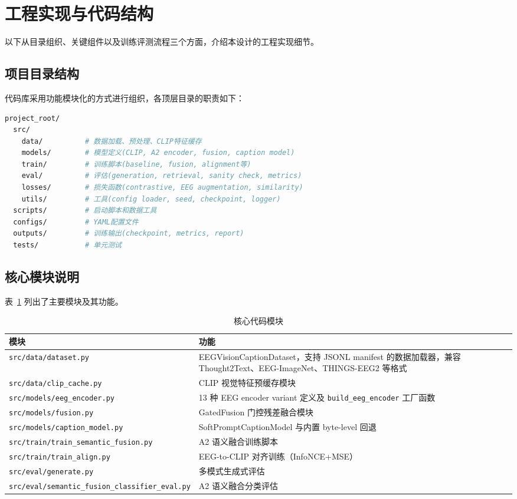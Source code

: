 \section{工程实现与代码结构}

以下从目录组织、关键组件以及训练评测流程三个方面，介绍本设计的工程实现细节。

\subsection{项目目录结构}

代码库采用功能模块化的方式进行组织，各顶层目录的职责如下：

\begin{lstlisting}[language=bash,caption={项目目录结构}]
project_root/
  src/
    data/          # 数据加载、预处理、CLIP特征缓存
    models/        # 模型定义(CLIP, A2 encoder, fusion, caption model)
    train/         # 训练脚本(baseline, fusion, alignment等)
    eval/          # 评估(generation, retrieval, sanity check, metrics)
    losses/        # 损失函数(contrastive, EEG augmentation, similarity)
    utils/         # 工具(config loader, seed, checkpoint, logger)
  scripts/         # 启动脚本和数据工具
  configs/         # YAML配置文件
  outputs/         # 训练输出(checkpoint, metrics, report)
  tests/           # 单元测试
\end{lstlisting}

\subsection{核心模块说明}

表~\ref{tab:code-modules} 列出了主要模块及其功能。

\begin{table}[htbp]
  \centering
  \caption{核心代码模块}
  \label{tab:code-modules}
  \begin{tabularx}{\linewidth}{l X}
    \toprule
    模块 & 功能 \\
    \midrule
    \texttt{src/data/dataset.py} & EEGVisionCaptionDataset，支持 JSONL manifest 的数据加载器，兼容 Thought2Text、EEG-ImageNet、THINGS-EEG2 等格式 \\
    \texttt{src/data/clip\_cache.py} & CLIP 视觉特征预缓存模块 \\
    \texttt{src/models/eeg\_encoder.py} & 13 种 EEG encoder variant 定义及 \texttt{build\_eeg\_encoder} 工厂函数 \\
    \texttt{src/models/fusion.py} & GatedFusion 门控残差融合模块 \\
    \texttt{src/models/caption\_model.py} & SoftPromptCaptionModel 与内置 byte-level 回退 \\
    \texttt{src/train/train\_semantic\_fusion.py} & A2 语义融合训练脚本 \\
    \texttt{src/train/train\_align.py} & EEG-to-CLIP 对齐训练（InfoNCE+MSE）\\
    \texttt{src/eval/generate.py} & 多模式生成式评估 \\
    \texttt{src/eval/semantic\_fusion\_classifier\_eval.py} & A2 语义融合分类评估 \\
    \bottomrule
  \end{tabularx}
\end{table}


